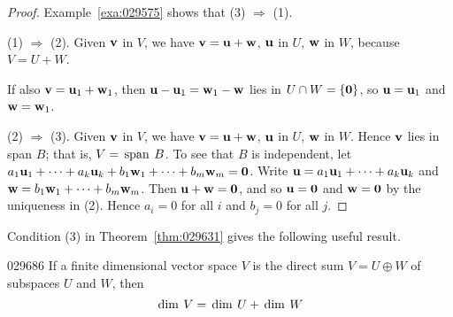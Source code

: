 \begin{proof}
Example~\ref{exa:029575} shows that (3) $\Rightarrow$ (1).


(1) $\Rightarrow$ (2). Given $\textbf{v}$ in $V$, we have $\textbf{v} = \textbf{u} + \textbf{w}$, $\textbf{u}$ in $U$, $\textbf{w}$ in $W$, because $V = U + W$.


\noindent If also $\textbf{v} = \textbf{u}_{1} + \textbf{w}_{1}$, then $\textbf{u} - \textbf{u}_{1} = \textbf{w}_{1} - \textbf{w}$ lies in $U \cap W = \{\textbf{0}\}$, so $\textbf{u} = \textbf{u}_{1}$ and $\textbf{w} = \textbf{w}_{1}$.


(2) $\Rightarrow$ (3). Given $\textbf{v}$ in $V$, we have $\textbf{v} = \textbf{u} + \textbf{w}$, $\textbf{u}$ in $U$, $\textbf{w}$ in $W$. Hence $\textbf{v}$ lies in span $B$; that is, $V = \thinspace\operatorname{span \medspace}B$. To see that $B$ is independent, let $a_{1}\textbf{u}_{1} + \cdots + a_{k}\textbf{u}_{k} + b_{1}\textbf{w}_{1} + \cdots + b_{m}\textbf{w}_{m} = \textbf{0}$. Write $\textbf{u} = a_{1}\textbf{u}_{1} + \cdots + a_{k}\textbf{u}_{k}$ and $\textbf{w} = b_{1}\textbf{w}_{1} + \cdots + b_{m}\textbf{w}_{m}$. Then $\textbf{u} + \textbf{w} = \textbf{0}$, and so $\textbf{u} = \textbf{0}$ and $\textbf{w} = \textbf{0}$ by the uniqueness in (2). Hence $a_{i} = 0$ for all $i$ and $b_{j} = 0$ for all $j$.
\end{proof}

Condition (3) in Theorem~\ref{thm:029631} gives the following useful result.


\begin{theorem}{}{029686}
If a finite dimensional vector space $V$ is the direct sum $V = U \oplus W$ of subspaces $U$ and $W$, then
\begin{equation*}
\thinspace\operatorname{dim \medspace} V = \thinspace\operatorname{dim \medspace} U + \thinspace\operatorname{dim \medspace} W
\end{equation*}
\end{theorem}

